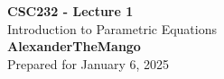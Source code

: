 \begin{titlepage}
    \null %
    \vfill
    \begin{center}
        {\fontsize{40}{48}\selectfont \bfseries CSC232 - Lecture 1}
        \vspace{20pt} \\
        {\LARGE Introduction to Parametric Equations} \\
        \vspace{20pt}
        \textbf{AlexanderTheMango}
        \vspace{8pt}
        \\ Prepared for January 6, 2025
    \end{center}
    \vfill
\end{titlepage}
